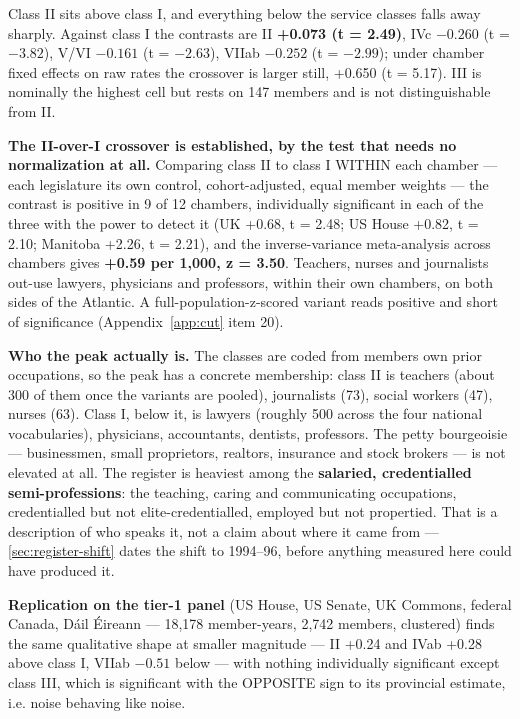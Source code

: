 Class II sits above class I, and everything below the service classes falls
away sharply. Against class I the contrasts are II \textbf{+0.073 (t = 2.49)}, IVc
\(-0.260\) (t = \(-3.82\)), V/VI \(-0.161\) (t = \(-2.63\)), VIIab \(-0.252\) (t = \(-2.99\)); under
chamber fixed effects on raw rates the crossover is larger still, +0.650
(t = 5.17). III is nominally the highest cell but rests on 147 members and is
not distinguishable from II.

\textbf{The II-over-I crossover is established, by the test that needs no normalization at all.} Comparing class II to class I WITHIN each chamber --- each legislature its own control, cohort-adjusted, equal member weights --- the contrast is positive in 9 of 12 chambers, individually significant in each of the three with the power to detect it (UK +0.68, t = 2.48; US House +0.82, t = 2.10; Manitoba +2.26, t = 2.21), and the inverse-variance meta-analysis across chambers gives \textbf{+0.59 per 1,000, z = 3.50}. Teachers, nurses and journalists out-use lawyers, physicians and professors, within their own chambers, on both sides of the Atlantic. A full-population-z-scored variant reads positive and short of significance (Appendix~\ref{app:cut} item 20).

\textbf{Who the peak actually is.} The classes are coded from members\textquotesingle{} own prior
occupations, so the peak has a concrete membership: class II is teachers (about
300 of them once the variants are pooled), journalists (73), social workers
(47), nurses (63). Class I, below it, is lawyers (roughly 500 across the four
national vocabularies), physicians, accountants, dentists, professors. The
petty bourgeoisie --- businessmen, small proprietors, realtors, insurance and
stock brokers --- is not elevated at all. The register is heaviest among the
\textbf{salaried, credentialled semi-professions}: the teaching, caring and
communicating occupations, credentialled but not elite-credentialled, employed
but not propertied. That is a description of who speaks it, not a claim about
where it came from --- \cref{sec:register-shift} dates the shift to 1994--96, before anything measured
here could have produced it.

\textbf{Replication on the tier-1 panel} (US House, US Senate, UK Commons, federal
Canada, Dáil Éireann --- 18,178 member-years, 2,742 members, clustered) finds
the same qualitative shape at smaller magnitude --- II +0.24 and IVab +0.28
above class I, VIIab \(-0.51\) below --- with nothing individually significant
except class III, which is significant with the OPPOSITE sign to its
provincial estimate, i.e. noise behaving like noise.

